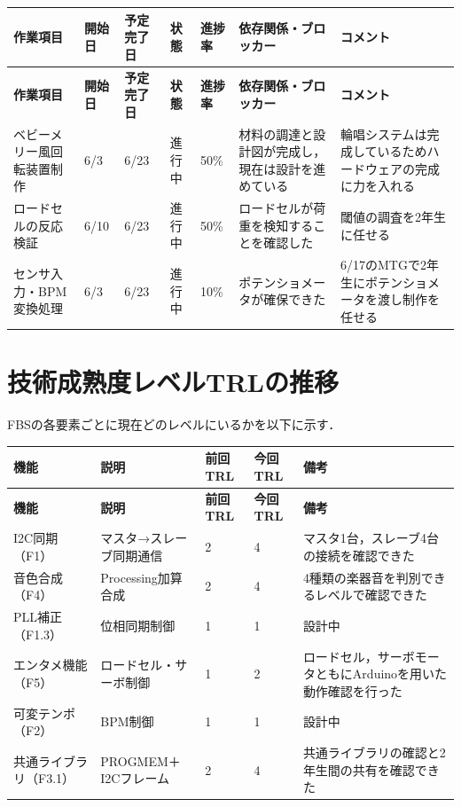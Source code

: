 \documentclass[a4paper,12pt]{ltjsarticle}
\begin{document}
\begin{longtable}{C{2cm}C{1.6cm}C{1.6cm}C{2.2cm}C{1.2cm}L{2.4cm}L{3cm}}
  \toprule
  \textbf{作業項目} & \textbf{開始日} & \textbf{予定完了日} & \textbf{状態} & \textbf{進捗率} & \textbf{依存関係・ブロッカー} & \textbf{コメント} \\
  \midrule
  \endfirsthead
  \toprule
  \textbf{作業項目} & \textbf{開始日} & \textbf{予定完了日} & \textbf{状態} & \textbf{進捗率} & \textbf{依存関係・ブロッカー} & \textbf{コメント} \\
  \midrule
  \endhead
  \midrule
  \endfoot
  \bottomrule
  \endlastfoot
  ベビーメリー風回転装置制作 & 6/3 & 6/23 & 進行中 & 50\% & 材料の調達と設計図が完成し，現在は設計を進めている & 輪唱システムは完成しているためハードウェアの完成に力を入れる \\
  ロードセルの反応検証 & 6/10 & 6/23 & 進行中 & 50\% & ロードセルが荷重を検知することを確認した & 閾値の調査を2年生に任せる \\
  センサ入力・BPM変換処理 & 6/3 & 6/23 & 進行中 & 10\% & ポテンショメータが確保できた & 6/17のMTGで2年生にポテンショメータを渡し制作を任せる
\end{longtable}

\section{技術成熟度レベルTRLの推移}
FBSの各要素ごとに現在どのレベルにいるかを以下に示す．

\begin{longtable}{L{2.5cm}L{4cm}C{2cm}C{2cm}L{3.5cm}}
  \toprule
  \textbf{機能} & \textbf{説明} & \textbf{前回TRL} & \textbf{今回TRL} & \textbf{備考} \\
  \midrule
  \endfirsthead
  \toprule
  \textbf{機能} & \textbf{説明} & \textbf{前回TRL} & \textbf{今回TRL} & \textbf{備考} \\
  \midrule
  \endhead
  \midrule
  \endfoot
  \bottomrule
  \endlastfoot
  I2C同期（F1） & マスタ→スレーブ同期通信 & 2 & 4 & マスタ1台，スレーブ4台の接続を確認できた \\
  音色合成（F4） & Processing加算合成 & 2 & 4 & 4種類の楽器音を判別できるレベルで確認できた \\
  PLL補正（F1.3） & 位相同期制御 & 1 & 1 & 設計中 \\
  エンタメ機能（F5） & ロードセル・サーボ制御 & 1 & 2 & ロードセル，サーボモータともにArduinoを用いた動作確認を行った \\
  可変テンポ（F2） & BPM制御 & 1 & 1 & 設計中 \\
  共通ライブラリ（F3.1） & PROGMEM＋I2Cフレーム & 2 & 4 & 共通ライブラリの確認と2年生間の共有を確認できた \\
\end{longtable}
\end{document}
